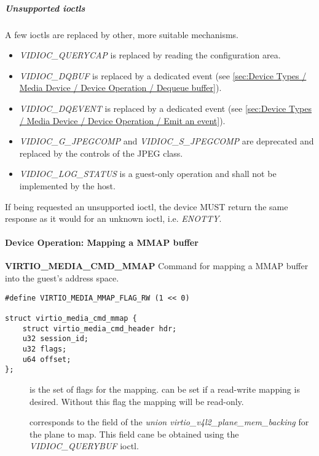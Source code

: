 \subparagraph{Unsupported ioctls}

A few ioctls are replaced by other, more suitable mechanisms.

\begin{itemize}
\item \textit{VIDIOC_QUERYCAP} is replaced by reading the configuration area.
\item \textit{VIDIOC_DQBUF} is replaced by a dedicated event
(see \ref{sec:Device Types / Media Device / Device Operation / Dequeue buffer}).
\item \textit{VIDIOC_DQEVENT} is replaced by a dedicated event
(see \ref{sec:Device Types / Media Device / Device Operation / Emit an event}).
\item \textit{VIDIOC_G_JPEGCOMP} and \textit{VIDIOC_S_JPEGCOMP} are deprecated
and replaced by the controls of the JPEG class.
\item \textit{VIDIOC_LOG_STATUS} is a guest-only operation and shall not be
implemented by the host.
\end{itemize}


If being requested an unsupported ioctl, the device MUST return the same
response as it would for an unknown ioctl, i.e. \textit{ENOTTY}.

\paragraph{Device Operation: Mapping a MMAP buffer}

\textbf{VIRTIO_MEDIA_CMD_MMAP} Command for mapping a MMAP buffer into the
guest's address space.

\begin{lstlisting}
#define VIRTIO_MEDIA_MMAP_FLAG_RW (1 << 0)

struct virtio_media_cmd_mmap {
	struct virtio_media_cmd_header hdr;
	u32 session_id;
	u32 flags;
	u64 offset;
};
\end{lstlisting}

\begin{description}
\item[] is the set of flags for the mapping. 
can be set if a read-write mapping is desired. Without this flag the mapping
will be read-only.
\item[] corresponds to the  field of the
\textit{union virtio_v4l2_plane_mem_backing} for the plane to map. This field
cane be obtained using the \textit{VIDIOC_QUERYBUF} ioctl.
\end{description}

